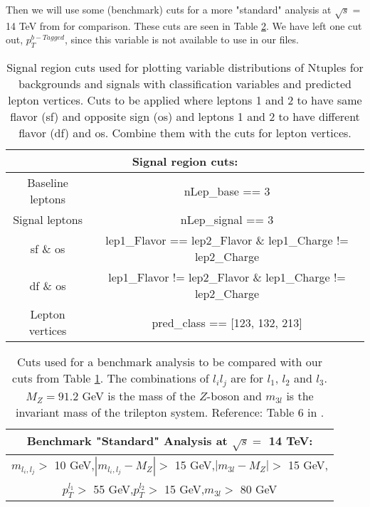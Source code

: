 \documentclass[a4paper, american, 12pt]{report}
\begin{document}
	Then we will use some (benchmark) cuts for a more "standard" analysis at $\sqrt{s} =$ 14 TeV from \citet{inverseseesaw} for comparison. These cuts are seen in Table \ref{tab:Cuts_Benchmark}. We have left one cut out, $p_T^{b-Tagged}$, since this variable is not available to use in our files.
	\begin{table}[h!]
		\hspace{-0.5cm}
		\begin{tabular}{|c|c|}
			\hline
			\multicolumn{2}{|c|}{\textbf{Signal region cuts:}}\\
			\hline \rule{0pt}{13pt}
			Baseline leptons & nLep\_base == 3 \\
			Signal leptons & nLep\_signal == 3 \\
			\acrshort{sf} \& \acrshort{os} & lep1\_Flavor == lep2\_Flavor \& lep1\_Charge != lep2\_Charge\\
			\acrshort{df} \& \acrshort{os} & lep1\_Flavor != lep2\_Flavor \& lep1\_Charge != lep2\_Charge\\
			Lepton vertices & pred\_class == [123, 132, 213]\\
			\hline
		\end{tabular}
		\caption[Signal region cuts for Ntuples.]{Signal region cuts used for plotting variable distributions of Ntuples for backgrounds and signals with classification variables and predicted lepton vertices. Cuts to be applied where leptons 1 and 2 to have same flavor (\acrshort{sf}) and opposite sign (\acrshort{os}) and leptons 1 and 2 to have different flavor (\acrshort{df}) and \acrshort{os}. Combine them with the cuts for lepton vertices.}
		\label{tab:Cuts_class}
	\end{table}
	\begin{table}[ht!]
		\centering
		\begin{tabular}{|c|}
			\hline \rule{0pt}{13pt}
			\textbf{Benchmark "Standard" Analysis at $\sqrt{s}=$ 14 TeV:}\\
			\hline \rule{0pt}{13pt}
			$m_{l_i,l_j}>$ 10 GeV,\quad $|m_{l_i,l_j}-M_Z|>$ 15 GeV,\quad $|m_{3l}-M_Z|>$ 15 GeV,\\
			$p_T^{l_1}>$ 55 GeV,\quad $p_T^{l_2}>$ 15 GeV,\quad $m_{3l}>$ 80 GeV\\
			\hline
		\end{tabular}
		\caption[Benchmark analysis cuts.]{Cuts used for a benchmark analysis to be compared with our cuts from Table \ref{tab:Cuts_class}. The combinations of $l_il_j$ are for $l_1$, $l_2$ and $l_3$. $M_Z=91.2$ GeV is the mass of the $Z$-boson and $m_{3l}$ is the invariant mass of the trilepton system. Reference: Table 6 in \citet{inverseseesaw}.}
		\label{tab:Cuts_Benchmark}
	\end{table}
			
\end{document}

